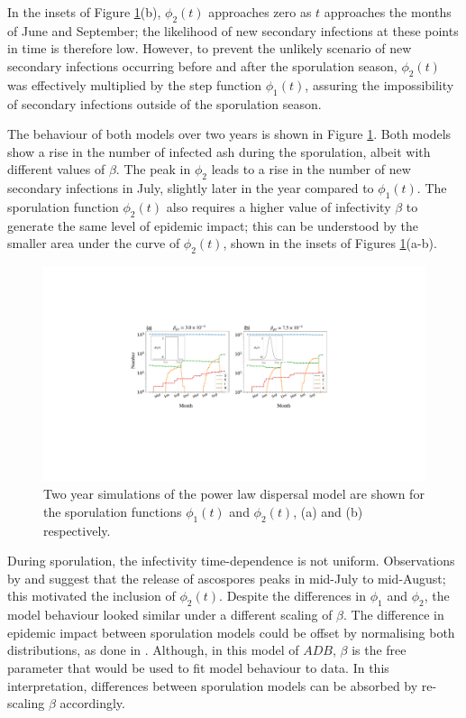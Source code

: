 In the insets of Figure \ref{fig:SEIR-sporulation}(b), $\phi_2(t)$ approaches zero as $t$ approaches the months of June and September; the likelihood of new secondary infections at these points in time is therefore low. However, to prevent the unlikely scenario of new secondary infections occurring before and after the sporulation season, $\phi_2(t)$ was effectively multiplied by the step function $\phi_1(t)$, assuring the impossibility of secondary infections outside of the sporulation season.

The behaviour of both models over two years is shown in Figure \ref{fig:SEIR-sporulation}. Both models show a rise in the number of infected ash during the sporulation, albeit with different values of $\beta$.
The peak in $\phi_2$ leads to a rise in the number of new secondary infections in July, slightly later in the year compared to $\phi_1(t)$. The sporulation function $\phi_2(t)$ also requires a higher value of infectivity $\beta$ to generate the same level of epidemic impact; this can be understood by the smaller area under the curve of $\phi_2(t)$, shown in the insets of Figures \ref{fig:SEIR-sporulation}(a-b). 

\begin{figure}
    \centering
    \includegraphics[scale=0.45]{chapter6/figures/fig5-sporulation.pdf}
    \caption{Two year simulations of the power law dispersal model are shown for the sporulation functions $\phi_1(t)$ and $\phi_2(t)$, (a) and (b) respectively.}
    \label{fig:SEIR-sporulation}
\end{figure}

During sporulation, the infectivity time-dependence is not uniform. Observations by \cite{hietala2013invasive} and \cite{grosdidier2018tracking} suggest that the release of ascospores peaks in mid-July to mid-August; this motivated the inclusion of $\phi_2(t)$. Despite the differences in $\phi_1$ and $\phi_2$, the model behaviour looked similar under a different scaling of $\beta$.
The difference in epidemic impact between sporulation models could be offset by normalising both distributions, as done in \cite{time-varying-infectivity, segarra2001epidemic}. 
Although, in this model of $ADB$, $\beta$ is the free parameter that would be used to fit model behaviour to data. In this interpretation, differences between sporulation models can be absorbed by re-scaling $\beta$ accordingly.

